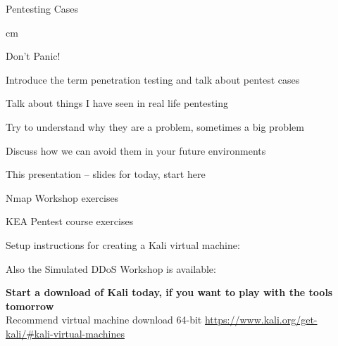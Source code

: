 \documentclass[Screen16to9,17pt]{foils}
\begin{document}
{}

\mytitlepage
{Pentesting Cases}


 cm

\centerline{\color{titlecolor}\LARGE Don't Panic!}


\begin{list1}
\item Introduce the term penetration testing and talk about pentest cases
\item Talk about things I have seen in real life pentesting
\item Try to understand why they are a problem, sometimes a big problem
\item Discuss how we can avoid them in your future environments
\end{list1}


\begin{list2}
\item This presentation -- slides for today, start here
\item Nmap Workshop exercises\\{\footnotesize
{}}
\item KEA Pentest course exercises\\{\footnotesize
{}}
\item Setup instructions for creating a Kali virtual machine:\\
\item Also the Simulated DDoS Workshop is available:\\{\footnotesize
{}}
\end{list2}


{\bf Start a download of Kali today, if you want to play with the tools tomorrow}\\
Recommend virtual machine download 64-bit \url{https://www.kali.org/get-kali/#kali-virtual-machines}
\end{document}
